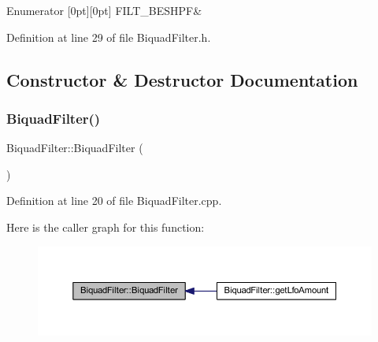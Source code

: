 \begin{DoxyEnumFields}{Enumerator}
[0pt][0pt]{}\mbox{\label{class_biquad_filter_a173337ea2d17607e19495cf7b91f1110ada971aea56389a82cad5bcdc742cb887}} 
F\+I\+L\+T\+\_\+\+B\+E\+S\+H\+PF&\\
\hline

\end{DoxyEnumFields}


Definition at line 29 of file Biquad\+Filter.\+h.



\subsection{Constructor \& Destructor Documentation}
\mbox{\label{class_biquad_filter_a58057f61de80a0103d49a075db1843d7}} 
\subsubsection{\texorpdfstring{Biquad\+Filter()}{BiquadFilter()}}
{\footnotesize\ttfamily Biquad\+Filter\+::\+Biquad\+Filter (\begin{DoxyParamCaption}{ }\end{DoxyParamCaption})}



Definition at line 20 of file Biquad\+Filter.\+cpp.

Here is the caller graph for this function\+:
\nopagebreak
\begin{figure}[H]
\begin{center}
\leavevmode
\includegraphics[width=350pt]{d9/d6f/class_biquad_filter_a58057f61de80a0103d49a075db1843d7_icgraph}
\end{center}
\end{figure}
\mbox{\label{class_biquad_filter_aafdd776f1b96fd9c01c5ea8adbfae35a}} 
